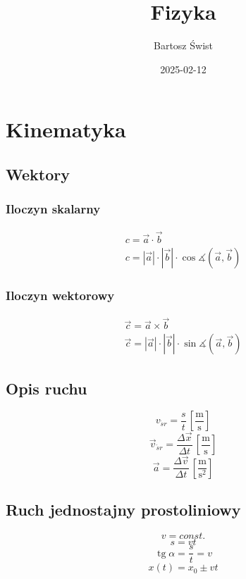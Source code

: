 \documentclass{report}
\title{Fizyka}
\date{2025-02-12}
\author{Bartosz Świst}
\numberwithin{equation}{chapter}
\DeclareMathOperator{\tg}{tg}
\newcommand{\unit}[1]{\,\left[\mathrm{#1}\right]}
\begin{document}
  \maketitle
  \newpage
  \chapter{Kinematyka}
    \section{Wektory}
      \subsection{Iloczyn skalarny}
        \begin{gather}
          c = \vec a \cdot \vec b\\
          c = |\vec a|\cdot |\vec b|\cdot\cos\measuredangle(\vec a, \vec b)
        \end{gather}
      \subsection{Iloczyn wektorowy}
        \begin{gather}
          \vec c = \vec a \times \vec b\\
          \vec c = |\vec a|\cdot |\vec b|\cdot\sin\measuredangle(\vec a, \vec b)
        \end{gather}
    \section{Opis ruchu}
      \begin{equation}
        v_{\acute sr} = \frac st \unit{\frac ms}
      \end{equation}
      \begin{equation}
        \vec v_{\acute sr} = \frac{\Delta\vec x}{\Delta t} \unit{\frac ms}
      \end{equation}
      \begin{equation}
        \vec a = \frac{\Delta\vec v}{\Delta t} \unit{\frac{m}{s^2}}
      \end{equation}
    \section{Ruch jednostajny prostoliniowy}
      \begin{equation}
        v = const.
      \end{equation}
      \begin{equation}
        s = vt
      \end{equation}
      \begin{equation}
        \tg\alpha = \frac st = v
      \end{equation}
      \begin{equation}
        x(t) = x_0 \pm vt
      \end{equation}
\end{document}
